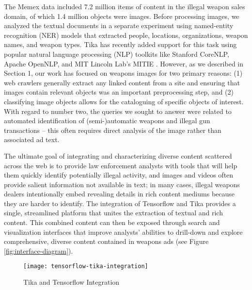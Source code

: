 The Memex data included 7.2 million items of content in the illegal weapon sales domain, of which 1.4 million objects were images. Before processing images, we analyzed the textual documents in a separate experiment using named-entity recognition (NER) models that extracted people, locations, organizations, weapon names, and weapon types. Tika has recently added support for this task using popular natural language processing (NLP) toolkits like Stanford CoreNLP\cite{Finkel:2005:INI:1219840.1219885}, Apache OpenNLP\cite{ApacheOpenNLP}, and MIT Lincoln Lab's MITIE \cite{MITIE-github}. However, as we described in Section 1, our work has focused on weapons images for two primary reasons: (1) web crawlers generally extract any linked content from a site and ensuring that images contain relevant objects was an important preprocessing step, and (2) classifying image objects allows for the cataloguing of specific objects of interest. 
With regard to number two, the queries we sought to answer were related to automated identification of (semi-)automatic weapons and illegal gun transactions -- this often requires direct analysis of the image rather than associated ad text. 

The ultimate goal of integrating and characterizing diverse content scattered across the web is to provide law enforcement analysts with tools that will help them quickly identify potentially illegal activity, and images and videos often provide salient information not available in text; in many cases, illegal weapons dealers intentionally embed revealing details in rich content mediums because they are harder to identify. The integration of Tensorflow and Tika provides a single, streamlined platform that unites the extraction of textual and rich content. This combined content can then be exposed through search and visualization interfaces that improve analysts' abilities to drill-down and explore comprehensive, diverse content contained in weapons ads (see Figure \ref{fig:interface-diagram}). 


\begin{figure*}[!t]
        \texttt{[image: tensorflow-tika-integration]}
        \caption{Tika and Tensorflow Integration}
        \label{fig:tf-tika-integration}
\end{figure*}

